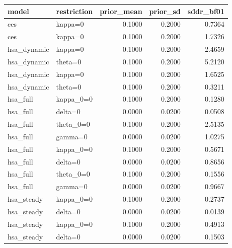 \begin{tabular}{llrrr}
\toprule
model & restriction & prior\_mean & prior\_sd & sddr\_bf01 \\
\midrule
ces & kappa=0 & 0.1000 & 0.2000 & 0.7364 \\
ces & kappa=0 & 0.1000 & 0.2000 & 1.7326 \\
hsa\_dynamic & kappa=0 & 0.1000 & 0.2000 & 2.4659 \\
hsa\_dynamic & theta=0 & 0.1000 & 0.2000 & 5.2120 \\
hsa\_dynamic & kappa=0 & 0.1000 & 0.2000 & 1.6525 \\
hsa\_dynamic & theta=0 & 0.1000 & 0.2000 & 0.3211 \\
hsa\_full & kappa\_0=0 & 0.1000 & 0.2000 & 0.1280 \\
hsa\_full & delta=0 & 0.0000 & 0.0200 & 0.0508 \\
hsa\_full & theta\_0=0 & 0.1000 & 0.2000 & 2.5135 \\
hsa\_full & gamma=0 & 0.0000 & 0.0200 & 1.0275 \\
hsa\_full & kappa\_0=0 & 0.1000 & 0.2000 & 0.5671 \\
hsa\_full & delta=0 & 0.0000 & 0.0200 & 0.8656 \\
hsa\_full & theta\_0=0 & 0.1000 & 0.2000 & 0.1556 \\
hsa\_full & gamma=0 & 0.0000 & 0.0200 & 0.9667 \\
hsa\_steady & kappa\_0=0 & 0.1000 & 0.2000 & 0.2737 \\
hsa\_steady & delta=0 & 0.0000 & 0.0200 & 0.0139 \\
hsa\_steady & kappa\_0=0 & 0.1000 & 0.2000 & 0.4913 \\
hsa\_steady & delta=0 & 0.0000 & 0.0200 & 0.1503 \\
\bottomrule
\end{tabular}
